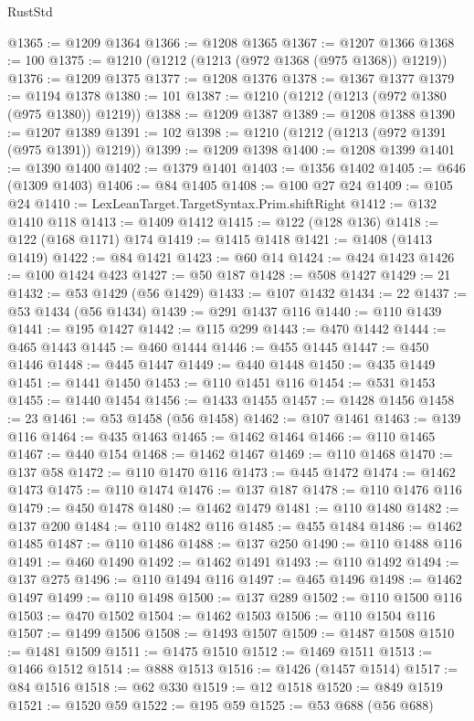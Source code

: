 \begin{lexlean}{RustStd}
\begin{coremodule}
@1365 := @1209 @1364
@1366 := @1208 @1365
@1367 := @1207 @1366
@1368 := 100
@1375 := @1210 (@1212 (@1213 (@972 @1368 (@975 @1368)) @1219))
@1376 := @1209 @1375
@1377 := @1208 @1376
@1378 := @1367 @1377
@1379 := @1194 @1378
@1380 := 101
@1387 := @1210 (@1212 (@1213 (@972 @1380 (@975 @1380)) @1219))
@1388 := @1209 @1387
@1389 := @1208 @1388
@1390 := @1207 @1389
@1391 := 102
@1398 := @1210 (@1212 (@1213 (@972 @1391 (@975 @1391)) @1219))
@1399 := @1209 @1398
@1400 := @1208 @1399
@1401 := @1390 @1400
@1402 := @1379 @1401
@1403 := @1356 @1402
@1405 := @646 (@1309 @1403)
@1406 := @84 @1405
@1408 := @100 @27 @24
@1409 := @105 @24
@1410 := LexLeanTarget.TargetSyntax.Prim.shiftRight
@1412 := @132 @1410 @118
@1413 := @1409 @1412
@1415 := @122 (@128 @136)
@1418 := @122 (@168 @1171) @174
@1419 := @1415 @1418
@1421 := @1408 (@1413 @1419)
@1422 := @84 @1421
@1423 := @60 @14
@1424 := @424 @1423
@1426 := @100 @1424 @423
@1427 := @50 @187
@1428 := @508 @1427
@1429 := 21
@1432 := @53 @1429 (@56 @1429)
@1433 := @107 @1432
@1434 := 22
@1437 := @53 @1434 (@56 @1434)
@1439 := @291 @1437 @116
@1440 := @110 @1439
@1441 := @195 @1427
@1442 := @115 @299
@1443 := @470 @1442
@1444 := @465 @1443
@1445 := @460 @1444
@1446 := @455 @1445
@1447 := @450 @1446
@1448 := @445 @1447
@1449 := @440 @1448
@1450 := @435 @1449
@1451 := @1441 @1450
@1453 := @110 @1451 @116
@1454 := @531 @1453
@1455 := @1440 @1454
@1456 := @1433 @1455
@1457 := @1428 @1456
@1458 := 23
@1461 := @53 @1458 (@56 @1458)
@1462 := @107 @1461
@1463 := @139 @116
@1464 := @435 @1463
@1465 := @1462 @1464
@1466 := @110 @1465
@1467 := @440 @154
@1468 := @1462 @1467
@1469 := @110 @1468
@1470 := @137 @58
@1472 := @110 @1470 @116
@1473 := @445 @1472
@1474 := @1462 @1473
@1475 := @110 @1474
@1476 := @137 @187
@1478 := @110 @1476 @116
@1479 := @450 @1478
@1480 := @1462 @1479
@1481 := @110 @1480
@1482 := @137 @200
@1484 := @110 @1482 @116
@1485 := @455 @1484
@1486 := @1462 @1485
@1487 := @110 @1486
@1488 := @137 @250
@1490 := @110 @1488 @116
@1491 := @460 @1490
@1492 := @1462 @1491
@1493 := @110 @1492
@1494 := @137 @275
@1496 := @110 @1494 @116
@1497 := @465 @1496
@1498 := @1462 @1497
@1499 := @110 @1498
@1500 := @137 @289
@1502 := @110 @1500 @116
@1503 := @470 @1502
@1504 := @1462 @1503
@1506 := @110 @1504 @116
@1507 := @1499 @1506
@1508 := @1493 @1507
@1509 := @1487 @1508
@1510 := @1481 @1509
@1511 := @1475 @1510
@1512 := @1469 @1511
@1513 := @1466 @1512
@1514 := @888 @1513
@1516 := @1426 (@1457 @1514)
@1517 := @84 @1516
@1518 := @62 @330
@1519 := @12 @1518
@1520 := @849 @1519
@1521 := @1520 @59
@1522 := @195 @59
@1525 := @53 @688 (@56 @688)

\end{coremodule}
\end{lexlean}
